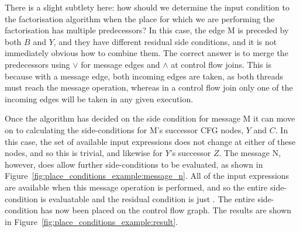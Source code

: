 There is a slight subtlety here: how should we determine the input
condition to the factorisation algorithm when the place for which we
are performing the factorisation has multiple predecessors?  In this
case, the edge M is preceded by both $B$ and $Y$, and they have
different residual side conditions, and it is not immediately obvious
how to combine them.  The correct answer is to merge the predecessors
using $\vee$ for message edges and $\wedge$ at control flow joins.
This is because with a message edge, both incoming edges are taken, as
both threads must reach the message operation, whereas in a control
flow join only one of the incoming edges will be taken in any given
execution.  

Once the algorithm has decided on the side condition for message M it
can move on to calculating the side-conditions for M's successor CFG
nodes, $Y$ and $C$.  In this case, the set of available input
expressions does not change at either of these nodes, and so this is
trivial, and likewise for $Y$'s successor $Z$.  The message N,
however, does allow further side-conditions to be evaluated, as shown
in Figure~\ref{fig:place_conditions_example:message_n}.  All of the
input expressions are available when this message operation is
performed, and so the entire side-condition is evaluatable and the
residual condition is just \true.  The entire side-condition has now
been placed on the control flow graph.  The results are shown in
Figure~\ref{fig:place_conditions_example:result}.

